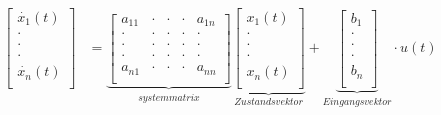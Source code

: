 \begin{equation}
    \begin{aligned}
        \left[
            \begin{array}{c}
                \dot{x_1}(t) \\
                \cdot        \\
                \cdot        \\
                \cdot        \\
                \dot{x_n}(t) \\
            \end{array}
        \right] & =\underbrace{\left[
                \begin{array}{ccccc}
                    a_{11} & \cdot & \cdot & \cdot & a_{1n} \\
                    \cdot  & \cdot & \cdot & \cdot & \cdot  \\
                    \cdot  & \cdot & \cdot & \cdot & \cdot  \\
                    \cdot  & \cdot & \cdot & \cdot & \cdot  \\
                    a_{n1} & \cdot & \cdot & \cdot & a_{nn} \\
                \end{array}
                \right]}_{systemmatrix}\underbrace{\left[
                \begin{array}{c}
                    x_1(t) \\
                    \cdot  \\
                    \cdot  \\
                    \cdot  \\
                    x_n(t) \\
                \end{array}
                \right]}_{Zustandsvektor}+\underbrace{\left[
                \begin{array}{c}
                    b_1   \\
                    \cdot \\
                    \cdot \\
                    \cdot \\
                    b_n   \\
                \end{array}
                \right]}_{Eingangsvektor}
        \cdot u(t)                                                                                 \\

\end{aligned}
\end{equation}
